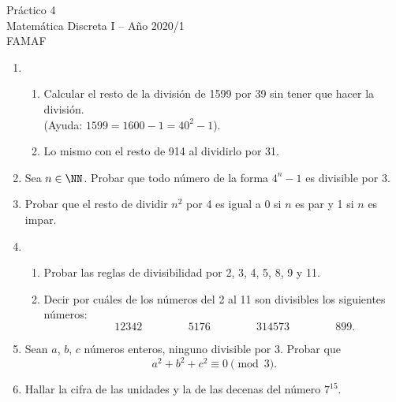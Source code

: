 \documentclass[12pt,spanish,makeidx]{amsbook}
\begin{document}
{\bf \begin{center} Práctico 4 \\ Matemática Discreta I -- Año 2020/1 \\ FAMAF \end{center}}

\smallskip


\begin{enumerate}
\item  
\begin{enumerate}
	\item Calcular el resto de la divisi\'on de 1599 por 39 sin tener que hacer la divisi\'on. \\(Ayuda: $1599=1600-1=40^2-1$).
	\item Lo mismo con el resto de 914 al dividirlo por 31.
\end{enumerate}


\smallskip
\item Sea $n\in\NN$. Probar que todo n\'umero de la forma $4^n-1$ es divisible por 3.

\smallskip
\item Probar que el resto de dividir $n^2$ por 4 es igual a 0 si $n$ es par y 1 si $n$ es impar.



\smallskip
\item
\begin{enumerate}
\item
Probar las reglas de divisibilidad por 2, 3, 4, 5, 8, 9 y 11.%
\item Decir por cu\'ales de los n\'umeros del 2 al 11 son divisibles los siguientes n\'umeros:
$$ \qquad 12342  \, \qquad   \qquad  5176 \, \qquad \qquad  314573\,  \qquad  \qquad  899.$$
\end{enumerate}


\smallskip
\item Sean $a$, $b$, $c$ n\'umeros enteros, ninguno divisible por 3. Probar que 
$$a^2 + b^2 + c^2\equiv 0 \pmod 3.$$%


\smallskip
\item Hallar la cifra de las unidades y la de las decenas del n\'umero $7^{15}$.



\end{enumerate}
\end{document}

